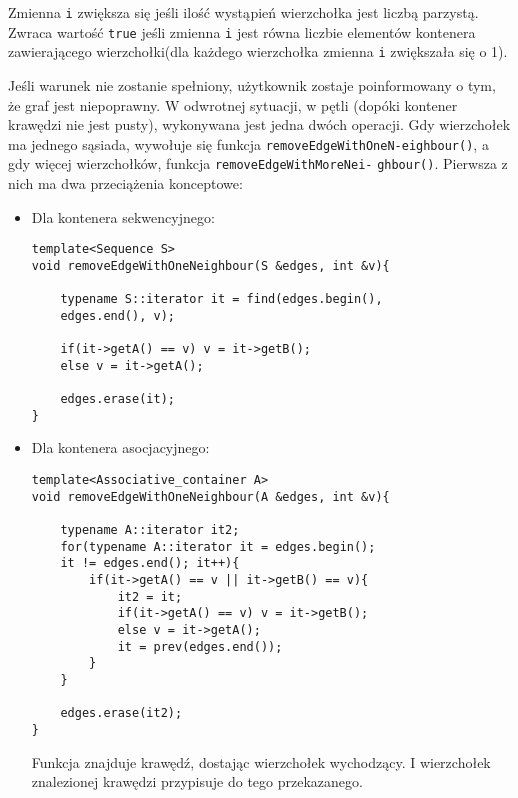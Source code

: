 \documentclass[11pt, a4paper]{article}
\begin{document}
Zmienna \verb#i#  zwiększa się jeśli ilość wystąpień wierzchołka jest liczbą parzystą. Zwraca wartość \verb#true# jeśli zmienna \verb#i# jest równa liczbie elementów kontenera zawierającego wierzchołki(dla każdego wierzchołka zmienna \verb#i# zwiększała się o 1).

Jeśli warunek nie zostanie spełniony, użytkownik zostaje poinformowany o tym, że graf jest niepoprawny. W odwrotnej sytuacji, w pętli (dopóki kontener krawędzi nie jest pusty), wykonywana jest jedna dwóch operacji. Gdy wierzchołek ma jednego sąsiada, wywołuje się funkcja \verb#removeEdgeWithOneN-#\newline \verb#eighbour()#, a gdy więcej wierzchołków, funkcja \verb#removeEdgeWithMoreNei-# \newline \verb#ghbour()#. Pierwsza z nich ma dwa przeciążenia konceptowe:
\begin{itemize}

\item Dla kontenera sekwencyjnego:
\begin{lstlisting}[frame=single]
template<Sequence S>
void removeEdgeWithOneNeighbour(S &edges, int &v){
    
    typename S::iterator it = find(edges.begin(), 
    edges.end(), v);
    
    if(it->getA() == v) v = it->getB();
    else v = it->getA();

    edges.erase(it);
}
\end{lstlisting}

\item Dla kontenera asocjacyjnego:
\begin{lstlisting}[frame=single]
template<Associative_container A>
void removeEdgeWithOneNeighbour(A &edges, int &v){
    
    typename A::iterator it2;
    for(typename A::iterator it = edges.begin();
    it != edges.end(); it++){
        if(it->getA() == v || it->getB() == v){
            it2 = it;
            if(it->getA() == v) v = it->getB();
            else v = it->getA();
            it = prev(edges.end());
        }
    }

    edges.erase(it2);
}
\end{lstlisting}

Funkcja znajduje krawędź, dostając wierzchołek wychodzący. I wierzchołek znalezionej krawędzi przypisuje do tego przekazanego.

\end{itemize}
\end{document}
